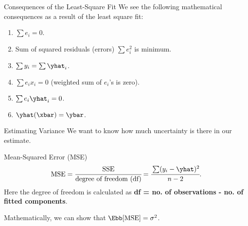 \documentclass[aspectratio=169,xcolor=dvipsnames,svgnames,x11names,fleqn]{beamer}
\begin{document}
        

\begin{frame}{Consequences of the Least-Square Fit}
    We see the following mathematical consequences as a result of the least square fit:
    \begin{enumerate}
        \item  $\sum e_i = 0$.
        \item Sum of squared residuals (errors) $\sum e_i^2$ is minimum.
        \item $\sum y_i = \sum \yhat_i$.
        \item $\sum e_i x_i = 0$ (weighted sum of $e_i$'s is zero).
        \item $\sum e_i \yhat_i = 0$.
        \item $\yhat(\xbar) = \ybar$.
    \end{enumerate}
    \end{frame}
    
    
    \begin{frame}{Estimating Variance}
        We want to know how much uncertainty is there in our estimate.
    
    \begin{tblock}{Mean-Squared Error (MSE)}
    \begin{equation}
         \textrm{MSE} = \cfrac{\textrm{SSE}}{\textrm{degree of freedom (df)}} = \cfrac{\sum (y_i -\yhat)^2}{n-2}.
    \end{equation}
    Here the degree of freedom is calculated as \textbf{df = no. of observations - no. of fitted components}.
    
    Mathematically, we can show that $\Ebb[\textrm{MSE}] =\sigma^2$.
    \end{tblock}
    \end{frame}
    
\end{document}
